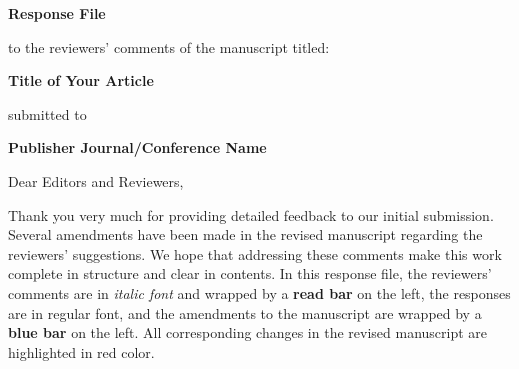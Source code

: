 
\begin{spacing}{1.5}

\begin{center}
{\LARGE
\textbf{Response File}
}

to the reviewers' comments of the manuscript titled:

{\large
\textbf{
Title of Your Article
}
}

submitted to

{\large
\textbf{
Publisher Journal/Conference Name
}
}
\end{center}
\end{spacing}
\noindent\hrulefill

\quad\newline
\noindent Dear Editors and Reviewers,

Thank you very much for providing detailed feedback to our initial submission. 
Several amendments have been made in the revised manuscript regarding the reviewers' suggestions. 
We hope that addressing these comments make this work complete in structure and clear in contents. 
In this response file, 
the reviewers' comments are in \textit{italic font} and wrapped by a \textbf{{\color{red}read bar}} on the left, 
the responses are in regular font, 
and the amendments to the manuscript are wrapped by a \textbf{{\color{blue}blue bar}} on the left. 
All corresponding changes in the revised manuscript are highlighted in {\color{red}red color}.
